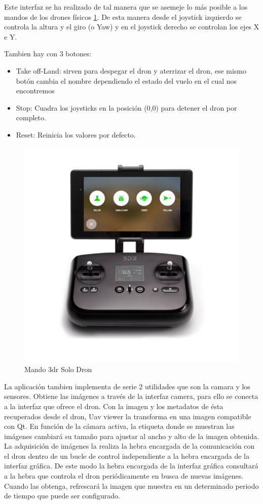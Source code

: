 Este interfaz se ha realizado de tal manera que se asemeje lo más posible a los mandos de los drones físicos \ref{fig:mando}. De esta manera desde el joystick izquierdo se controla la altura y el giro (o Yaw) y en el joystick derecho se controlan los ejes X e Y. 

Tambien hay con 3 botones:
\begin{itemize}
\item Take off-Land: sirven para despegar el dron y aterrizar el dron, ese mismo botón cambia el nombre dependiendo el estado del vuelo en el cual nos encontremos
\item Stop: Cuadra los joysticks en la posición (0,0) para detener el dron por completo.
\item Reset: Reinicia los valores por defecto.
\end{itemize}

\begin{figure}[H]
  \centering
  \includegraphics[scale=0.3]{imagenes/mando.jpg}
  \caption{Mando 3dr Solo Dron}
  \label{fig:mando}
\end{figure}

La aplicación tambien implementa de serie 2 utilidades que son la camara y los sensores. Obtiene las imágenes a través de la interfaz camera, para ello se conecta a la interfaz que ofrece el dron. Con la imagen y los metadatos de ésta recuperados desde el dron,
Uav viewer la transforma en una imagen compatible con Qt. En función de la cámara activa, la etiqueta donde se muestran las imágenes cambiará su tamaño para ajustar al ancho y alto de la imagen obtenida. La adquisición de imágenes la realiza la hebra encargada de la comunicación con el dron dentro de un bucle de control independiente a la hebra encargada de la interfaz gráfica. De este modo la hebra encargada de la interfaz gráfica consultará a la hebra que controla el dron periódicamente en busca de nuevas imágenes. Cuando las obtenga, refrescará la imagen que muestra en un determinado periodo de tiempo que puede ser configurado.


